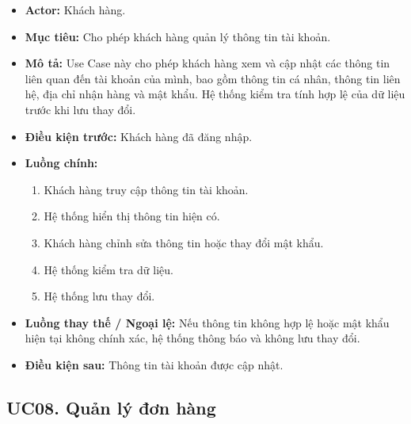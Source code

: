 \documentclass[12pt,a4paper]{article}
\begin{document}
\begin{itemize}

    \item \textbf{Actor:} Khách hàng.

    \item \textbf{Mục tiêu:} Cho phép khách hàng quản lý thông tin tài khoản.

    \item \textbf{Mô tả:} Use Case này cho phép khách hàng xem và cập nhật các thông tin liên quan đến tài khoản của mình, bao gồm thông tin cá nhân, thông tin liên hệ, địa chỉ nhận hàng và mật khẩu. Hệ thống kiểm tra tính hợp lệ của dữ liệu trước khi lưu thay đổi.

    \item \textbf{Điều kiện trước:} Khách hàng đã đăng nhập.

    \item \textbf{Luồng chính:}
    \begin{enumerate}
        \item Khách hàng truy cập thông tin tài khoản.
        \item Hệ thống hiển thị thông tin hiện có.
        \item Khách hàng chỉnh sửa thông tin hoặc thay đổi mật khẩu.
        \item Hệ thống kiểm tra dữ liệu.
        \item Hệ thống lưu thay đổi.
    \end{enumerate}

    \item \textbf{Luồng thay thế / Ngoại lệ:} Nếu thông tin không hợp lệ hoặc mật khẩu hiện tại không chính xác, hệ thống thông báo và không lưu thay đổi.

    \item \textbf{Điều kiện sau:} Thông tin tài khoản được cập nhật.

\end{itemize}

\subsection*{UC08. Quản lý đơn hàng}
\end{document}

